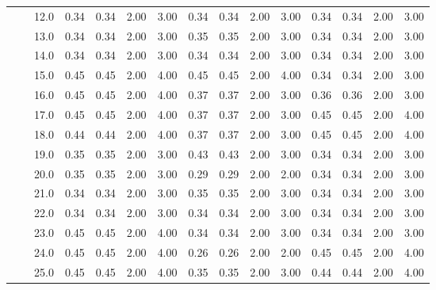 \begin{tabular}{lllrrrrrrrrrrrr}
       &     & 12.0 &       0.34 &      0.34 & 2.00 &   3.00 &       0.34 &      0.34 & 2.00 &   3.00 &       0.34 &      0.34 & 2.00 &   3.00 \\
       &     & 13.0 &       0.34 &      0.34 & 2.00 &   3.00 &       0.35 &      0.35 & 2.00 &   3.00 &       0.34 &      0.34 & 2.00 &   3.00 \\
       &     & 14.0 &       0.34 &      0.34 & 2.00 &   3.00 &       0.34 &      0.34 & 2.00 &   3.00 &       0.34 &      0.34 & 2.00 &   3.00 \\
       &     & 15.0 &       0.45 &      0.45 & 2.00 &   4.00 &       0.45 &      0.45 & 2.00 &   4.00 &       0.34 &      0.34 & 2.00 &   3.00 \\
       &     & 16.0 &       0.45 &      0.45 & 2.00 &   4.00 &       0.37 &      0.37 & 2.00 &   3.00 &       0.36 &      0.36 & 2.00 &   3.00 \\
       &     & 17.0 &       0.45 &      0.45 & 2.00 &   4.00 &       0.37 &      0.37 & 2.00 &   3.00 &       0.45 &      0.45 & 2.00 &   4.00 \\
       &     & 18.0 &       0.44 &      0.44 & 2.00 &   4.00 &       0.37 &      0.37 & 2.00 &   3.00 &       0.45 &      0.45 & 2.00 &   4.00 \\
       &     & 19.0 &       0.35 &      0.35 & 2.00 &   3.00 &       0.43 &      0.43 & 2.00 &   3.00 &       0.34 &      0.34 & 2.00 &   3.00 \\
       &     & 20.0 &       0.35 &      0.35 & 2.00 &   3.00 &       0.29 &      0.29 & 2.00 &   2.00 &       0.34 &      0.34 & 2.00 &   3.00 \\
       &     & 21.0 &       0.34 &      0.34 & 2.00 &   3.00 &       0.35 &      0.35 & 2.00 &   3.00 &       0.34 &      0.34 & 2.00 &   3.00 \\
       &     & 22.0 &       0.34 &      0.34 & 2.00 &   3.00 &       0.34 &      0.34 & 2.00 &   3.00 &       0.34 &      0.34 & 2.00 &   3.00 \\
       &     & 23.0 &       0.45 &      0.45 & 2.00 &   4.00 &       0.34 &      0.34 & 2.00 &   3.00 &       0.34 &      0.34 & 2.00 &   3.00 \\
       &     & 24.0 &       0.45 &      0.45 & 2.00 &   4.00 &       0.26 &      0.26 & 2.00 &   2.00 &       0.45 &      0.45 & 2.00 &   4.00 \\
       &     & 25.0 &       0.45 &      0.45 & 2.00 &   4.00 &       0.35 &      0.35 & 2.00 &   3.00 &       0.44 &      0.44 & 2.00 &   4.00 \\

\end{tabular}
